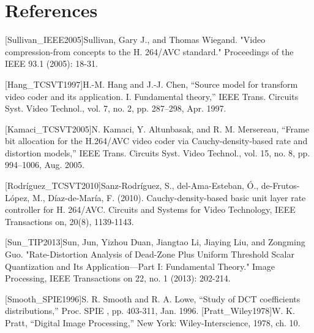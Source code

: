\documentclass[smallabstract,smallcaptions]{dccpaper}
\begin{document}

\section*{References}



[Sullivan\_IEEE2005]Sullivan, Gary J., and Thomas Wiegand. "Video compression-from concepts to the H. 264/AVC standard." Proceedings of the IEEE 93.1 (2005): 18-31.

[Hang\_TCSVT1997]H.-M. Hang and J.-J. Chen, “Source model for transform video coder
and its application. I. Fundamental theory,” IEEE Trans. Circuits Syst.
Video Technol., vol. 7, no. 2, pp. 287–298, Apr. 1997.

[Kamaci\_TCSVT2005]N. Kamaci, Y. Altunbasak, and R. M. Mersereau, “Frame bit allocation for the H.264/AVC video coder via Cauchy-density-based rate and distortion models,” IEEE Trans. Circuits Syst. Video Technol., vol. 15, no. 8, pp. 994–1006, Aug. 2005.

[Rodríguez\_TCSVT2010]Sanz-Rodríguez, S., del-Ama-Esteban, Ó., de-Frutos-López, M., Díaz-de-María, F. (2010). Cauchy-density-based basic unit layer rate controller for H. 264/AVC. Circuits and Systems for Video Technology, IEEE Transactions on, 20(8), 1139-1143.

[Sun\_TIP2013]Sun, Jun, Yizhou Duan, Jiangtao Li, Jiaying Liu, and Zongming Guo. "Rate-Distortion Analysis of Dead-Zone Plus Uniform Threshold Scalar Quantization and Its Application—Part I: Fundamental Theory." Image Processing, IEEE Transactions on 22, no. 1 (2013): 202-214.

[Smooth\_SPIE1996]S. R. Smooth and R. A. Lowe, “Study of DCT coefficients distributions,” Proc. SPIE , pp. 403-311, Jan. 1996.
[Pratt\_Wiley1978]W. K. Pratt, “Digital Image Processing,” New York: Wiley-Interscience, 1978, ch. 10.
\end{document}
